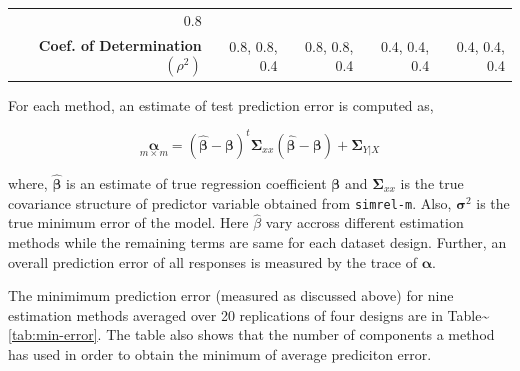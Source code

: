 \documentclass[12pt,A4paper,authoryear]{elsarticle} %
\theoremstyle{definition}
\theoremstyle{definition}
\theoremstyle{remark}
\begin{document}
\begin{longtable}[]{@{}rrrrr@{}}
\begin{minipage}[t]{0.13\columnwidth}
0.8\strut
\end{minipage}\tabularnewline
\begin{minipage}[t]{0.36\columnwidth}\raggedleft\strut
\textbf{Coef. of Determination \((\rho^2)\)}\strut
\end{minipage} & \begin{minipage}[t]{0.13\columnwidth}\raggedleft\strut
0.8, 0.8, 0.4\strut
\end{minipage} & \begin{minipage}[t]{0.13\columnwidth}\raggedleft\strut
0.8, 0.8, 0.4\strut
\end{minipage} & \begin{minipage}[t]{0.13\columnwidth}\raggedleft\strut
0.4, 0.4, 0.4\strut
\end{minipage} & \begin{minipage}[t]{0.13\columnwidth}\raggedleft\strut
0.4, 0.4, 0.4\strut
\end{minipage}\tabularnewline
\bottomrule
\end{longtable}

For each method, an estimate of test prediction error is computed as,

\[\underset{m \times m}{\boldsymbol{\alpha}} = 
\left(
\hat{\boldsymbol{\beta}} - \boldsymbol{\beta}
\right) ^t \boldsymbol{\Sigma}_{xx}
\left(
\hat{\boldsymbol{\beta}} - \boldsymbol{\beta}
\right) + \boldsymbol{\Sigma}_{Y|X}\]

where, \(\hat{\boldsymbol{\beta}}\) is an estimate of true regression
coefficient \(\boldsymbol{\beta}\) and \(\boldsymbol{\Sigma}_{xx}\) is
the true covariance structure of predictor variable obtained from
\texttt{simrel-m}. Also, \(\boldsymbol{\sigma}^2\) is the true minimum
error of the model. Here \(\hat{\beta}\) vary accross different
estimation methods while the remaining terms are same for each dataset
design. Further, an overall prediction error of all responses is
measured by the trace of \(\boldsymbol{\alpha}\).

The minimimum prediction error (measured as discussed above) for nine
estimation methods averaged over 20 replications of four designs are in
Table\textasciitilde{}\ref{tab:min-error}. The table also shows that the
number of components a method has used in order to obtain the minimum of
average prediciton error.
\end{document}
